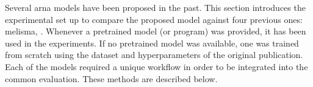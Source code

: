 
Several \gls{arna} models have been proposed in the past.
This section introduces the experimental set up to compare
the proposed model against four previous ones:
\gls{melisma}, \textcite{chen2021attend, micchi2021deep,
mcleod2021modular}. Whenever a pretrained model (or program)
was provided, it has been used in the experiments. If no
pretrained model was available, one was trained from scratch
using the dataset and hyperparameters of the original
publication. Each of the models required a unique workflow
in order to be integrated into the common evaluation. These
methods are described below. 
